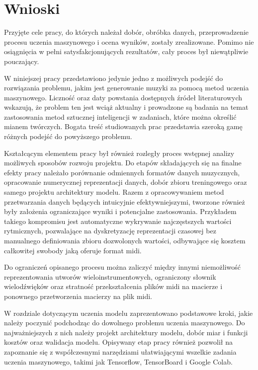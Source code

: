 \chapter{Wnioski}\label{chap:concl}
{
    
    Przyjęte cele pracy, do których należał dobór, obróbka danych,
    przeprowadzenie procesu uczenia maszynowego i ocena wyników, zostały zrealizowane. Pomimo nie osiągnięcia w pełni satysfakcjonujących rezultatów, cały proces był niewątpliwie pouczający. 

    W niniejszej pracy przedstawiono jedynie jedno z możliwych podejść do rozwiązania problemu,
    jakim jest generowanie muzyki za pomocą metod uczenia maszynowego. 
    Liczność oraz daty powstania dostępnych źródeł literaturowych wskazują, że problem ten jest wciąż aktualny 
    i prowadzone są badania na temat zastosowania metod sztucznej inteligencji w zadaniach, 
    które można określić mianem twórczych. Bogata treść studiowanych prac przedstawia szeroką gamę 
    różnych podejść do powyższego problemu.

    Kształcącym elementem pracy był również rozległy proces wstępnej analizy możliwych sposobów
    rozwoju projektu. Do etapów składających się na finalne efekty pracy należało porównanie odmiennych 
    formatów danych muzycznych, opracowanie numerycznej reprezentacji danych, dobór zbioru treningowego
    oraz samego projektu architektury modelu. 
    Razem z opracowywaniem metod przetwarzania danych będących intuicyjnie efektywniejszymi, tworzone również były założenia
    ograniczające wyniki i potencjalne zastosowania. Przykładem takiego kompromisu jest automatyczne wykrywanie
    najczęstszych wartości rytmicznych, pozwalające na dyskretyzację reprezentacji czasowej bez
    manualnego definiowania zbioru dozwolonych wartości, odbywające się kosztem całkowitej swobody jaką oferuje format midi.
    
    Do ograniczeń opisanego procesu można zaliczyć między innymi niemożliwość reprezentowania utworów wieloinstrumentowych, 
    ograniczony słownik wielodźwięków oraz stratność przekształcenia plików midi na macierze i ponownego przetworzenia
    macierzy na plik midi.

    W rozdziale dotyczącym uczenia modelu zaprezentowano podstawowe kroki, jakie należy poczynić podchodząc do
    dowolnego problemu uczenia maszynowego. Do najważniejszych z nich należy projekt architektury modelu,
    dobór miar i funkcji kosztów oraz walidacja modelu. Opisywany etap pracy również pozwolił na zapoznanie 
    się z współczesnymi narzędziami ułatwiającymi wszelkie zadania uczenia maszynowego, takimi jak Tensorflow, 
    TensorBoard i Google Colab. 

}

